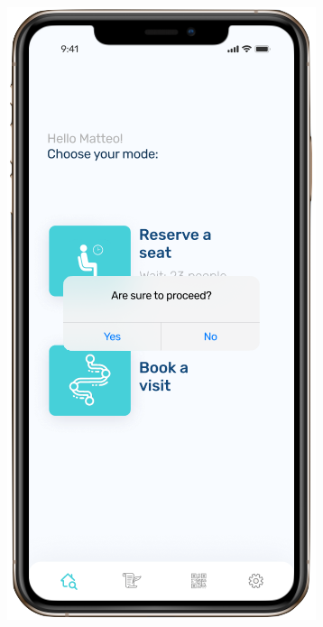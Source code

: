\begin{figure}[H]
\begin{center}
{            \includegraphics[scale=0.35]{images/mockup/reserve2.png}
        }%
        \subfloat[[Reservation's QRCode is provided]{%
            \label{fig:fourth}
}
\end{center}
\end{figure}
